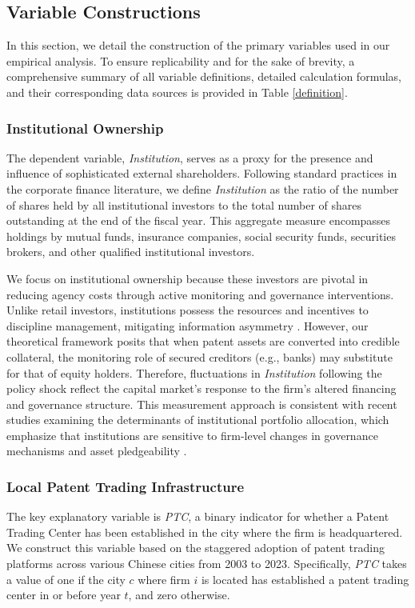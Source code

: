 \documentclass[12pt,a4paper]{article}
\begin{document}
\subsection{Variable Constructions}
In this section, we detail the construction of the primary variables used in our empirical analysis. To ensure replicability and for the sake of brevity, a comprehensive summary of all variable definitions, detailed calculation formulas, and their corresponding data sources is provided in Table \ref{definition}.

\subsubsection{Institutional Ownership}
The dependent variable, \textit{Institution}, serves as a proxy for the presence and influence of sophisticated external shareholders. Following standard practices in the corporate finance literature, we define \textit{Institution} as the ratio of the number of shares held by all institutional investors to the total number of shares outstanding at the end of the fiscal year. This aggregate measure encompasses holdings by mutual funds, insurance companies, social security funds, securities brokers, and other qualified institutional investors.

We focus on institutional ownership because these investors are pivotal in reducing agency costs through active monitoring and governance interventions. Unlike retail investors, institutions possess the resources and incentives to discipline management, mitigating information asymmetry \citep{ward2020motivated}. However, our theoretical framework posits that when patent assets are converted into credible collateral, the monitoring role of secured creditors (e.g., banks) may substitute for that of equity holders. Therefore, fluctuations in \textit{Institution} following the policy shock reflect the capital market’s response to the firm's altered financing and governance structure. This measurement approach is consistent with recent studies examining the determinants of institutional portfolio allocation, which emphasize that institutions are sensitive to firm-level changes in governance mechanisms and asset pledgeability \citep{mccahery2016behind}.

\subsubsection{Local Patent Trading Infrastructure}
The key explanatory variable is \textit{PTC}, a binary indicator for whether a Patent Trading Center has been established in the city where the firm is headquartered. We construct this variable based on the staggered adoption of patent trading platforms across various Chinese cities from 2003 to 2023. Specifically, \textit{PTC} takes a value of one if the city $c$ where firm $i$ is located has established a patent trading center in or before year $t$, and zero otherwise.
\end{document}
